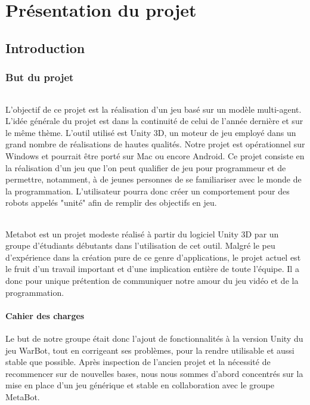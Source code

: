 \documentclass{report}
\begin{document}
\newpage
\tableofcontents
\newpage

\part{Présentation du projet}
\chapter{Introduction}
\section{But du projet}
\paragraph{}
L'objectif de ce projet est la réalisation d'un jeu basé sur un modèle multi-agent. L'idée générale du projet est dans la continuité de celui de l'année dernière et sur le même thème. L'outil utilisé est Unity 3D, un moteur de jeu employé dans un grand nombre de réalisations de hautes qualités. Notre projet est opérationnel sur Windows et pourrait être porté sur Mac ou encore Android.
Ce projet consiste en la réalisation d'un jeu que l'on peut qualifier de jeu pour programmeur et de permettre, notamment, à de jeunes personnes de se familiariser avec le monde de la programmation. L'utilisateur pourra donc créer un comportement pour des robots appelés "unité" afin de remplir des objectifs en jeu.
\paragraph{}
Metabot est un projet modeste réalisé à partir du logiciel Unity 3D par un groupe d'étudiants débutants dans l'utilisation de cet outil. Malgré le peu d'expérience dans la création pure de ce genre d'applications, le projet actuel est le fruit d'un travail important et d'une implication entière de toute l'équipe.
Il a donc pour unique prétention de communiquer notre amour du jeu vidéo et de la programmation.
\subsection{Cahier des charges}
Le but de notre groupe était donc l’ajout de fonctionnalités à la version Unity du jeu WarBot, tout en corrigeant ses problèmes, pour la rendre utilisable et aussi stable que possible. 
Après inspection de l’ancien projet et la nécessité de recommencer sur de nouvelles bases, nous nous sommes d’abord concentrés sur la mise en place d’un jeu générique et stable en collaboration avec le groupe MetaBot.
\end{document}
